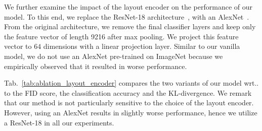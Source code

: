 \documentclass{article}
\makeatletter
\DeclareRobustCommand\onedot{\futurelet\@let@token\@onedot}
\def\@onedot{\ifx\@let@token.\else.\null\fi\xspace}
\def\wrt{wrt\onedot}
\newcommand{\tabref}[1]{Tab.~\ref{#1}}
\makeatother
\begin{document}
We further examine the impact of the layout encoder on the performance of our
model. To this end, we replace the ResNet-18 architecture~\cite{He2016CVPR},
with an AlexNet~\cite{Krizhevsky2012NIPS}. From the original architecture, we
remove the final classifier layers and keep only the feature vector of length
9216 after max pooling. We project this feature vector to $64$ dimensions with
a linear projection layer. Similar to our vanilla model, we do not use an AlexNet pre-trained on
ImageNet because we empirically observed that it resulted in worse performance.
\begin{table}[!h]
    \centering
    \vspace{0.6em}
    \caption{{\bf Ablation Study on the Layout Encoder Architecture.} This table shows a quantitative 
    comparison of ATISS with two different layout encoders.}
    \label{tab:ablation_layout_encoder}
    \vspace{-1.2em}
\end{table}


\tabref{tab:ablation_layout_encoder} compares the two variants of our model
\wrt to the FID score, the classification accuracy and the KL-divergence.
We remark that our method is not particularly sensitive to the choice of the layout encoder.
However, using an AlexNet results in slightly worse performance, hence we
utilize a ResNet-18 in all our experiments.
\end{document}
